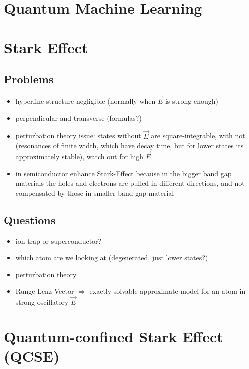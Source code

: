 
\section{Quantum Machine Learning}

\section{Stark Effect}

\subsection{Problems}
\begin{itemize}
        \item hyperfine structure negligible (normally when $\vec{E}$ is strong enough)
        \item perpendicular and transverse (formulas?)
        \item perturbation theory issue: states without $\vec{E}$ are square-integrable, with not (resonances of finite width, which have decay time, but for lower states its approximately stable), watch out for high $\vec{E}$
        \item in semiconductor enhance Stark-Effect because in the bigger band gap materials the holes and electrons are pulled in different directions, and not compensated by those in smaller band gap material
\end{itemize}

\subsection{Questions}
\begin{itemize}
    \item ion trap or superconductor?
    \item which atom are we looking at (degenerated, just lower states?)
    \item perturbation theory
    \item Runge-Lenz-Vector $\Rightarrow$ exactly solvable approximate model for an atom in strong oscillatory $\vec{E}$
\end{itemize}

\section{Quantum-confined Stark Effect (QCSE)}
